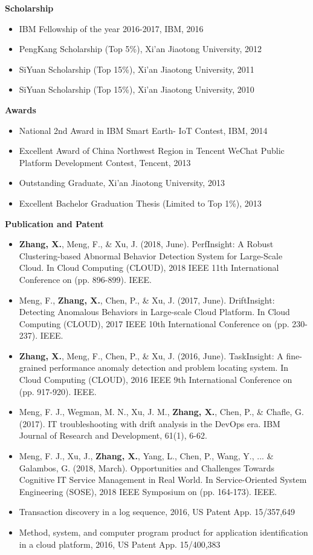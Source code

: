 \documentclass[letterpaper,11pt]{article}
\newcommand{\resheading}[1]{{\large \colorbox{mygrey}{\begin{minipage}{\textwidth}{\textbf{#1 \vphantom{p\^{E}}}}\end{minipage}}}}
\begin{document}
\resheading{Scholarship}
	\begin{itemize}
		\item
			IBM Fellowship of the year 2016-2017, IBM, 2016
		\item
			PengKang Scholarship (Top 5\%), Xi'an Jiaotong University, 2012
		\item
			SiYuan Scholarship (Top 15\%), Xi'an Jiaotong University, 2011
		\item
			SiYuan Scholarship (Top 15\%), Xi'an Jiaotong University, 2010
	\end{itemize}

\resheading{Awards}
	\begin{itemize}
		\item
			National 2nd Award in IBM Smart Earth- IoT Contest, IBM, 2014
		\item
			Excellent Award of China Northwest Region in Tencent WeChat Public Platform Development Contest, Tencent, 2013
		\item
			Outstanding Graduate, Xi'an Jiaotong University, 2013
		\item
			Excellent Bachelor Graduation Thesis (Limited to Top 1\%), 2013
	\end{itemize}
	

	



\resheading{Publication and Patent}
	\begin{itemize}
		\item
			\textbf{Zhang, X.}, Meng, F., \& Xu, J. (2018, June).  PerfInsight: A Robust Clustering-based Abnormal Behavior Detection System for Large-Scale Cloud. In Cloud Computing (CLOUD), 2018 IEEE 11th International Conference on (pp. 896-899). IEEE.
		\item
			Meng, F., \textbf{Zhang, X.}, Chen, P., \& Xu, J. (2017, June). DriftInsight: Detecting Anomalous Behaviors in Large-scale Cloud Platform. In Cloud Computing (CLOUD), 2017 IEEE 10th International Conference on (pp. 230-237). IEEE.
		\item
			\textbf{Zhang, X.}, Meng, F., Chen, P., \& Xu, J. (2016, June). TaskInsight: A fine-grained performance anomaly detection and problem locating system. In Cloud Computing (CLOUD), 2016 IEEE 9th International Conference on (pp. 917-920). IEEE.
		\item
			Meng, F. J., Wegman, M. N., Xu, J. M., \textbf{Zhang, X.}, Chen, P., \& Chafle, G. (2017). IT troubleshooting with drift analysis in the DevOps era. IBM Journal of Research and Development, 61(1), 6-62.
		\item
			Meng, F. J., Xu, J., \textbf{Zhang, X.}, Yang, L., Chen, P., Wang, Y., ... \& Galambos, G. (2018, March). Opportunities and Challenges Towards Cognitive IT Service Management in Real World. In Service-Oriented System Engineering (SOSE), 2018 IEEE Symposium on (pp. 164-173). IEEE.
		\item
			Transaction discovery in a log sequence, 2016, US Patent App. 15/357,649
		\item
			Method, system, and computer program product for application identification in a cloud platform, 2016, US Patent App. 15/400,383
		\end{itemize}
\end{document}
